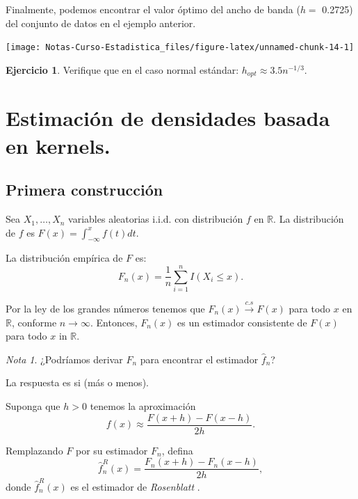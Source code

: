 \documentclass[
  12pt,
]{book}
\theoremstyle{definition}
\theoremstyle{definition}
\theoremstyle{definition}
\newtheorem{exercise}{Ejercicio}[chapter]
\theoremstyle{definition}
\theoremstyle{remark}
\newtheorem*{remark}{Nota}
\begin{document}
Finalmente, podemos encontrar el valor óptimo del ancho de banda (\(h=\) 0.2725) del conjunto de datos en el ejemplo anterior.

\begin{center}\texttt{[image: Notas-Curso-Estadistica\_files/figure-latex/unnamed-chunk-14-1]} \end{center}

\begin{exercise}
\protect\hypertarget{exr:unnamed-chunk-15}{}\label{exr:unnamed-chunk-15}Verifique que en el caso normal estándar: \(h_{opt}\approx 3.5 n^{-1/3}\).
\end{exercise}

\hypertarget{estimaciuxf3n-de-densidades-basada-en-kernels.}{%
\section{Estimación de densidades basada en kernels.}\label{estimaciuxf3n-de-densidades-basada-en-kernels.}}

\hypertarget{primera-construcciuxf3n}{%
\subsection{Primera construcción}\label{primera-construcciuxf3n}}

Sea \(X_{1},\ldots,X_{n}\) variables aleatorias i.i.d. con distribución \(f\) en \(\mathbb{R}\). La distribución de \(f\) es \(F(x)=\int_{-\infty}^{x}f(t)dt\).

La distribución empírica de \(F\) es:
\[
F_{n}(x)=\frac{1}{n}\sum_{i=1}^{n}I(X_{i}\leq x).
\]

Por la ley de los grandes números tenemos que \(F_{n}(x) \xrightarrow{c.s} F(x)\) para todo \(x\) en \(\mathbb{R}\), conforme
\(n\rightarrow\infty\). Entonces, \(F_{n}(x)\) es un estimador consistente de \(F(x)\) para todo \(x\) in \(\mathbb{R}\).

\begin{remark}
¿Podríamos derivar \(F_n\) para encontrar el estimador \(\hat{f}_n\)?
\end{remark}

La respuesta es si (más o menos).

Suponga que \(h>0\) tenemos la aproximación
\[
f(x)\approx\frac{F(x+h)-F(x-h)}{2h}.
\]

Remplazando \(F\) por su estimador \(F_{n}\), defina
\[
\hat{f}_{n}^{R}(x)=\frac{F_{n}(x+h)-F_{n}(x-h)}{2h},
\]
donde \(\hat{f}_{n}^{R}(x)\) es el estimador de \emph{Rosenblatt} .
\end{document}
